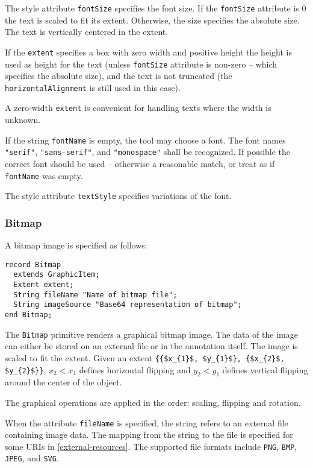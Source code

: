 The style attribute \lstinline!fontSize! specifies the font size.
If the \lstinline!fontSize! attribute is 0 the text is scaled to fit its extent.
Otherwise, the size specifies the absolute size.
The text is vertically centered in the extent.

If the \lstinline!extent! specifies a box with zero width and positive height the height is used as height for the text (unless \lstinline!fontSize! attribute is non-zero -- which specifies the absolute size), and the text is not truncated (the \lstinline!horizontalAlignment! is still used in this case).

\begin{nonnormative}
A zero-width \lstinline!extent! is convenient for handling texts where the width is unknown.
\end{nonnormative}

If the string \lstinline!fontName! is empty, the tool may choose a font.
The font names \lstinline!"serif"!, \lstinline!"sans-serif"!, and \lstinline!"monospace"! shall be recognized.
If possible the correct font should be used -- otherwise a reasonable match, or treat as if \lstinline!fontName! was empty.

The style attribute \lstinline!textStyle! specifies variations of the font.

\subsubsection{Bitmap}\label{bitmap}

A bitmap image is specified as follows:
\begin{lstlisting}[language=modelica]
record Bitmap
  extends GraphicItem;
  Extent extent;
  String fileName "Name of bitmap file";
  String imageSource "Base64 representation of bitmap";
end Bitmap;
\end{lstlisting}%
The \lstinline!Bitmap! primitive renders a graphical bitmap image.
The data of the image can either be stored on an external file or in the annotation itself.
The image is scaled to fit the extent.
Given an extent \lstinline!{{$x_{1}$, $y_{1}$}, {$x_{2}$, $y_{2}$}}!, $x_{2} < x_{1}$ defines horizontal flipping and $y_{2} < y_{1}$ defines vertical flipping around the center of the object.

The graphical operations are applied in the order: scaling, flipping and rotation.

When the attribute \lstinline!fileName! is specified, the string refers to an external file containing image data.
The mapping from the string to the file is specified for some URIs in \cref{external-resources}.
The supported file formats include \lstinline!PNG!, \lstinline!BMP!, \lstinline!JPEG!, and \lstinline!SVG!.

